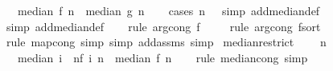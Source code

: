 \begin{isabellebody}
\ \ \ {\isachardoublequoteopen}median\ f\ n\ {\isacharequal}{\kern0pt}\ median\ g\ n{\isachardoublequoteclose}\isanewline
%
\isadelimproof
\ \ %
\endisadelimproof
%
\isatagproof
{}\isamarkupfalse%
\ {\isacharparenleft}{\kern0pt}cases\ {\isachardoublequoteopen}n\ {\isacharequal}{\kern0pt}\ {}{\isachardoublequoteclose}{\isacharcomma}{\kern0pt}\ simp\ add{\isacharcolon}{\kern0pt}median{\isacharunderscore}{\kern0pt}def{\isacharparenright}{\kern0pt}\isanewline
\ \ \isamarkupfalse%
\ {\isacharparenleft}{\kern0pt}simp\ add{\isacharcolon}{\kern0pt}median{\isacharunderscore}{\kern0pt}def{\isacharparenright}{\kern0pt}\isanewline
\ \ \isamarkupfalse%
\ {\isacharparenleft}{\kern0pt}rule\ arg{\isacharunderscore}{\kern0pt}cong{}{\isacharbrackleft}{\kern0pt}\ f{\isacharequal}{\kern0pt}{\isachardoublequoteopen}{\isacharparenleft}{\kern0pt}{\isacharbang}{\kern0pt}{\isacharparenright}{\kern0pt}{\isachardoublequoteclose}{\isacharbrackright}{\kern0pt}{\isacharparenright}{\kern0pt}\isanewline
\ \ \ \isamarkupfalse%
\ {\isacharparenleft}{\kern0pt}rule\ arg{\isacharunderscore}{\kern0pt}cong{\isacharbrackleft}{\kern0pt}\ f{\isacharequal}{\kern0pt}{\isachardoublequoteopen}sort{\isachardoublequoteclose}{\isacharbrackright}{\kern0pt}{\isacharparenright}{\kern0pt}\isanewline
\ \ \isamarkupfalse%
\ {\isacharparenleft}{\kern0pt}rule\ map{\isacharunderscore}{\kern0pt}cong{\isacharcomma}{\kern0pt}\ simp{\isacharcomma}{\kern0pt}\ simp\ add{\isacharcolon}{\kern0pt}assms{\isacharcomma}{\kern0pt}\ simp{\isacharparenright}{\kern0pt}%
\endisatagproof
{\isafoldproof}%
%
\isadelimproof
\isanewline
%
\endisadelimproof
\isanewline
{}\isamarkupfalse%
\ median{\isacharunderscore}{\kern0pt}restrict{\isacharcolon}{\kern0pt}\ \isanewline
\ \ \ {\isachardoublequoteopen}n\ {\isachargreater}{\kern0pt}\ {}{\isachardoublequoteclose}\isanewline
\ \ \ {\isachardoublequoteopen}median\ {\isacharparenleft}{\kern0pt}{\isasymlambda}i\ {\isasymin}\ {\isacharbraceleft}{\kern0pt}{}{\isachardot}{\kern0pt}{\isachardot}{\kern0pt}{\isacharless}{\kern0pt}n{\isacharbraceright}{\kern0pt}{\isachardot}{\kern0pt}f\ i{\isacharparenright}{\kern0pt}\ n\ {\isacharequal}{\kern0pt}\ median\ f\ n{\isachardoublequoteclose}\isanewline
%
\isadelimproof
\ \ %
\endisadelimproof
%
\isatagproof
{}\isamarkupfalse%
\ {\isacharparenleft}{\kern0pt}rule\ median{\isacharunderscore}{\kern0pt}cong{\isacharcomma}{\kern0pt}\ simp{\isacharparenright}{\kern0pt}%

\end{isabellebody}
